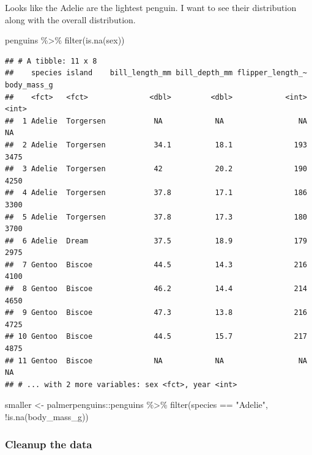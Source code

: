 \documentclass[
]{article}
\newenvironment{Shaded}{\begin{snugshade}}{\end{snugshade}}
\newcommand{\FunctionTok}[1]{\textcolor[rgb]{0.00,0.00,0.00}{#1}}
\newcommand{\NormalTok}[1]{#1}
\newcommand{\OtherTok}[1]{\textcolor[rgb]{0.56,0.35,0.01}{#1}}
\newcommand{\SpecialCharTok}[1]{\textcolor[rgb]{0.00,0.00,0.00}{#1}}
\newcommand{\StringTok}[1]{\textcolor[rgb]{0.31,0.60,0.02}{#1}}
\begin{document}
Looks like the Adelie are the lightest penguin. I want to see their
distribution along with the overall distribution.

\begin{Shaded}
\begin{Highlighting}[]
\NormalTok{penguins }\SpecialCharTok{\%\textgreater{}\%} 
  \FunctionTok{filter}\NormalTok{(}\FunctionTok{is.na}\NormalTok{(sex))}
\end{Highlighting}
\end{Shaded}

\begin{verbatim}
## # A tibble: 11 x 8
##    species island    bill_length_mm bill_depth_mm flipper_length_~ body_mass_g
##    <fct>   <fct>              <dbl>         <dbl>            <int>       <int>
##  1 Adelie  Torgersen           NA            NA                 NA          NA
##  2 Adelie  Torgersen           34.1          18.1              193        3475
##  3 Adelie  Torgersen           42            20.2              190        4250
##  4 Adelie  Torgersen           37.8          17.1              186        3300
##  5 Adelie  Torgersen           37.8          17.3              180        3700
##  6 Adelie  Dream               37.5          18.9              179        2975
##  7 Gentoo  Biscoe              44.5          14.3              216        4100
##  8 Gentoo  Biscoe              46.2          14.4              214        4650
##  9 Gentoo  Biscoe              47.3          13.8              216        4725
## 10 Gentoo  Biscoe              44.5          15.7              217        4875
## 11 Gentoo  Biscoe              NA            NA                 NA          NA
## # ... with 2 more variables: sex <fct>, year <int>
\end{verbatim}

\begin{Shaded}
\begin{Highlighting}[]
\NormalTok{smaller }\OtherTok{\textless{}{-}}\NormalTok{ palmerpenguins}\SpecialCharTok{::}\NormalTok{penguins }\SpecialCharTok{\%\textgreater{}\%} 
  \FunctionTok{filter}\NormalTok{(species }\SpecialCharTok{==} \StringTok{"Adelie"}\NormalTok{, }
         \SpecialCharTok{!}\FunctionTok{is.na}\NormalTok{(body\_mass\_g))}
\end{Highlighting}
\end{Shaded}

\hypertarget{cleanup-the-data}{%
\subsubsection{Cleanup the data}\label{cleanup-the-data}}
\end{document}
